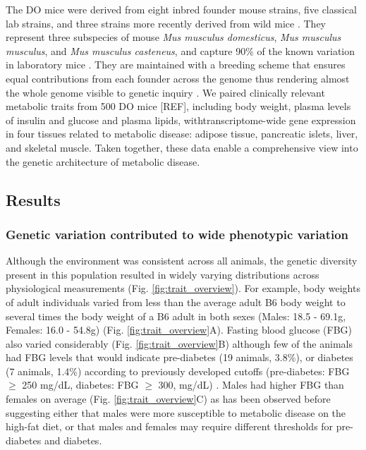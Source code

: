 \documentclass[
]{article}
\begin{document}
The DO mice were derived from eight inbred founder mouse strains, five
classical lab strains, and three strains more recently derived from wild
mice \cite{pmid22892839}. They represent three subspecies of mouse
\textit{Mus musculus domesticus}, \textit{Mus musculus musculus}, and
\textit{Mus musculus casteneus}, and capture 90\% of the known variation
in laboratory mice \cite{pmid31133439}. They are maintained with a
breeding scheme that ensures equal contributions from each founder
across the genome thus rendering almost the whole genome visible to
genetic inquiry \cite{pmid22892839}. We paired clinically relevant
metabolic traits from 500 DO mice {[}REF{]}, including body weight,
plasma levels of insulin and glucose and plasma lipids,
withtranscriptome-wide gene expression in four tissues related to
metabolic disease: adipose tissue, pancreatic islets, liver, and
skeletal muscle. Taken together, these data enable a comprehensive view
into the genetic architecture of metabolic disease.

\subsection{Results}\label{results}

\subsubsection{Genetic variation contributed to wide phenotypic
variation}\label{genetic-variation-contributed-to-wide-phenotypic-variation}

Although the environment was consistent across all animals, the genetic
diversity present in this population resulted in widely varying
distributions across physiological measurements (Fig.
\ref{fig:trait_overview}). For example, body weights of adult
individuals varied from less than the average adult B6 body weight to
several times the body weight of a B6 adult in both sexes (Males: 18.5 -
69.1g, Females: 16.0 - 54.8g) (Fig. \ref{fig:trait_overview}A). Fasting
blood glucose (FBG) also varied considerably (Fig.
\ref{fig:trait_overview}B) although few of the animals had FBG levels
that would indicate pre-diabetes (19 animals, 3.8\%), or diabetes (7
animals, 1.4\%) according to previously developed cutoffs (pre-diabetes:
FBG \(\geq\) 250 mg/dL, diabetes: FBG \(\geq\) 300, mg/dL)
\cite{pmid17018838}. Males had higher FBG than females on average (Fig.
\ref{fig:trait_overview}C) as has been observed before suggesting either
that males were more susceptible to metabolic disease on the high-fat
diet, or that males and females may require different thresholds for
pre-diabetes and diabetes.
\end{document}
